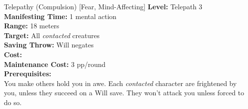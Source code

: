 {Telepathy (Compulsion) [Fear, Mind-Affecting]}
{
	\textbf{Level:}
	Telepath 3\\
	\textbf{Manifesting Time:}
	1 mental action\\
	\textbf{Range:}
	18  meters\\
	\textbf{Target:}
	All \emph{contacted} creatures\\
	\textbf{Saving Throw:}
	Will negates\\
	\textbf{Cost:}
	\\
	\textbf{Maintenance Cost:}
	3 pp/round\\
	\textbf{Prerequisites:}
	\\
}
{
	You make others hold you in awe. Each \emph{contacted} character are frightened by you, unless they succeed on a Will save. They won't attack you unless forced to do so.
}

